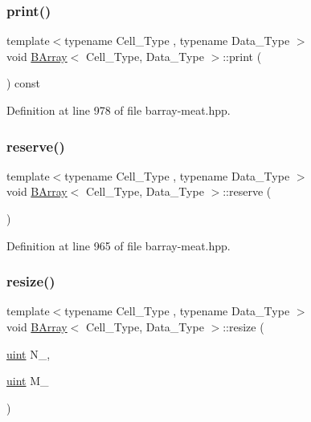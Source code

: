 \mbox{\label{class_b_array_a9d150c44b23cf1e4af45f540508db1de}} 
\subsubsection{\texorpdfstring{print()}{print()}}
{\footnotesize\ttfamily template$<$typename Cell\+\_\+\+Type , typename Data\+\_\+\+Type $>$ \\
void \hyperlink{class_b_array}{B\+Array}$<$ Cell\+\_\+\+Type, Data\+\_\+\+Type $>$\+::print (\begin{DoxyParamCaption}{ }\end{DoxyParamCaption}) const\hspace{0.3cm}{\ttfamily [inline]}}



Definition at line 978 of file barray-\/meat.\+hpp.

\mbox{\label{class_b_array_a5eacd388e3d0f638f2c35b6e0f0c490c}} 
\subsubsection{\texorpdfstring{reserve()}{reserve()}}
{\footnotesize\ttfamily template$<$typename Cell\+\_\+\+Type , typename Data\+\_\+\+Type $>$ \\
void \hyperlink{class_b_array}{B\+Array}$<$ Cell\+\_\+\+Type, Data\+\_\+\+Type $>$\+::reserve (\begin{DoxyParamCaption}{ }\end{DoxyParamCaption})\hspace{0.3cm}{\ttfamily [inline]}}



Definition at line 965 of file barray-\/meat.\+hpp.

\mbox{\label{class_b_array_aefe411fe1890273518bfbc3f8ca616ce}} 
\subsubsection{\texorpdfstring{resize()}{resize()}}
{\footnotesize\ttfamily template$<$typename Cell\+\_\+\+Type , typename Data\+\_\+\+Type $>$ \\
void \hyperlink{class_b_array}{B\+Array}$<$ Cell\+\_\+\+Type, Data\+\_\+\+Type $>$\+::resize (\begin{DoxyParamCaption}\item[{\hyperlink{typedefs_8hpp_a91ad9478d81a7aaf2593e8d9c3d06a14}{uint}}]{N\+\_\+,  }\item[{\hyperlink{typedefs_8hpp_a91ad9478d81a7aaf2593e8d9c3d06a14}{uint}}]{M\+\_\+ }\end{DoxyParamCaption})\hspace{0.3cm}{\ttfamily [inline]}}



